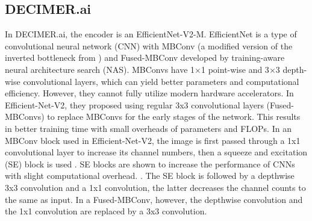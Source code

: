 \documentclass{article}
\begin{document}
\subsection{DECIMER.ai}
In DECIMER.ai, the encoder is an EfficientNet-V2-M. EfficientNet is a type of convolutional neural network (CNN) with MBConv \autocite{tan_efficientnet:_2020} (a modified version of the inverted bottleneck from \autocite{mobilenet}) and Fused-MBConv \autocite{suyog_efficientnet-edgetpu:_2019} developed by training-aware neural architecture search (NAS). \autocite{swin_tran} \autocite{effv2} MBConvs have 1$\times$1 point-wise and 3$\times$3 depth-wise convolutional layers, which can yield better parameters and computational efficiency. \autocite{mobilenet} \autocite{effv2} However, they cannot fully utilize modern hardware accelerators. In Efficient-Net-V2, they proposed using regular 3x3 convolutional layers (Fused-MBConvs) to replace MBConvs for the early stages of the network. This results in better training time with small overheads of parameters and FLOPs. In an MBConv block used in Efficient-Net-V2, the image is first passed through a 1x1 convolutional layer to increase its channel numbers, then a squeeze and excitation (SE) block is used \autocite{hu_squeeze-and-excitation_2019}\autocite{tan_efficientnet:_2020}. SE blocks are shown to increase the performance of CNNs with slight computational overhead. \autocite{hu_squeeze-and-excitation_2019}. The SE block is followed by a depthwise 3x3 convolution and a 1x1 convolution, the latter decreases the channel counts to the same as input. In a Fused-MBConv, however, the depthwise convolution and the 1x1 convolution are replaced by a 3x3 convolution. \autocite{effv2} \autocite{mobilenet}
\end{document}
